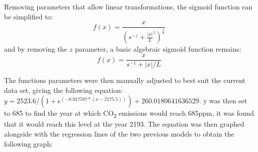 \documentclass[12pt]{mcmthesis}
\begin{document}
    Removing parameters that allow linear transformations, the sigmoid function can be simplified to:
%
    \begin{equation}
        f(x) = \frac{x}{\left(s^{-z}+\frac{\left|x\right|}{L}^{z}\right)^{\frac{1}{z}}}
    \end{equation}
%
    and by removing the $z$ parameter, a basic algebraic sigmoid function remains:
%
    \begin{equation}
        f(x) = \frac{x}{s^{-1}+{\left|x\right|}/{L}}
    \end{equation}

    The function\textquotesingle s parameters were then manually adjusted to best suit the current data set, giving the following equation: ${y = 2523.6 / (1 + e^{(-0.017587 * (x - 2175.5))}) + 260.0180641636529}$. {y} was then set to 685 to find the year at which CO\textsubscript{2} emissions would reach 685ppm, it was found that it would reach this level at the year 2193. The equation was then graphed alongside with the regression lines of the two previous models to obtain the following graph:
\end{document}
